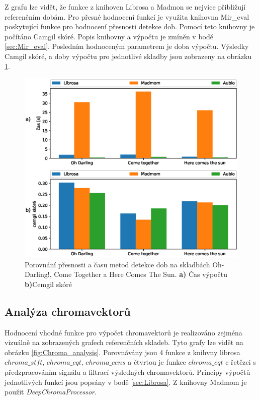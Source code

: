 Z grafu lze vidět, že funkce z knihoven Librosa a Madmon se nejvíce přibližují referenčním dobám. Pro přesné hodnocení funkcí je využita knihovna Mir\_eval poskytující funkce pro hodnocení přesnosti detekce dob. Pomocí teto knihovny je počítáno Camgil skóré. Popis knihovny a výpočtu je zmíněn v bodě \ref{sec:Mir_eval}. Posledním hodnoceným parametrem je doba výpočtu. Výsledky Camgil skóré, a doby výpočtu pro jednotlivé skladby jsou zobrazeny na obrázku \ref{fig:Beat_tracking_time_and_cemgil}.

\begin{figure}[H]
    \centering
    \includegraphics[width = 1\linewidth]{obrazky/Beat_tracking_time_and_cemgil_graphs.eps}
    \caption{Porovnání přesnosti a času metod detekce dob na skladbách Oh-Darling!, Come Together a Here Comes The Sun. \textbf{a)} Čas výpočtu \textbf{b)}Cemgil skóré}
    \label{fig:Beat_tracking_time_and_cemgil}
\end{figure}

\subsection{Analýza chromavektorů}

Hodnocení vhodné funkce pro výpočet chromavektorů je realizováno zejména vizuálně na zobrazených grafech referenčních skladeb. Tyto grafy lze vidět na obrázku \ref{fig:Chroma_analysis}. Porovnávány jsou 4 funkce z knihvny librosa $chroma\_stft$, $chroma\_cqt$, $chroma\_cens$ a čtvrtou je funkce $chroma\_cqt$ c řetězci s předzpracováním signálu a filtrací výsledných chromavektorů. Principy výpočtů jednotlivých funkcí jsou popsány v bodě \ref{sec:Librosa}. Z knihovny Madmom je použit \textit{DeepChromaProcessor}.

